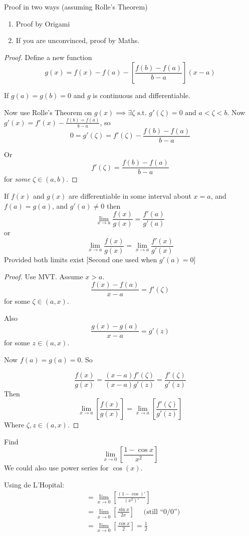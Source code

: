 \documentclass[twoside]{scrartcl}
\begin{document}
Proof in two ways (assuming Rolle's Theorem)

\begin{enumerate}
  \item Proof by Origami
  \item If you are unconvinced, proof by Maths. 
\end{enumerate}

\begin{proof}
Define a new function 
\[g(x) = f(x) - f(a) - \left[\frac{f(b) -f(a)}{b-a}\right](x-a)\]

If $g(a) = g(b) = 0$ and $g$ is continuous and differentiable. 

Now use Rolle's Theorem on $g(x) \implies \exists \zeta \text{ s.t. } g'(\zeta) = 0 \text{ and } a < \zeta < b$. Now $g'(x) = f'(x) - \frac{f(b) = f(a)}{b-a}$, so 
\[0 = g'(\zeta) = f'(\zeta) - \frac{f(b) - f(a)}{b-a}\]

Or
\[f'(\zeta) = \frac{f(b) - f(a)}{b-a}\]
for \emph{some} $\zeta \in (a,b)$.
\end{proof}


\vspace*{5pt}

\begin{theorem}
If $f(x)$ and $g(x)$ are differentiable in some interval about $x=a$, and $f(a) = g(a)$, and $g'(a) \neq 0$ then 
\[\lim_{x \to a}\frac{f(x)}{g(x)} = \frac{f'(a)}{g'(a)}\]	
or
\[\lim_{x \to a}\frac{f(x)}{g(x)} = \lim_{x \to a}\frac{f'(x)}{g'(x)}\]	
Provided both limits exist [Second one used when $g'(a) = 0$]
\end{theorem}\vspace*{5pt}


\begin{proof}
Use MVT. Assume $x > a$. 
\[\frac{f(x) - f(a)}{x-a} = f'(\zeta)\]
for some $\zeta \in (a,x)$. 

Also 
\[\frac{g(x) - g(a)}{x-a} = g'(z)\]
for some $z \in (a,x)$. 

Now $f(a) = g(a) = 0$. So 

\[\frac{f(x)}{g(x)} = \frac{(x-a)f'(\zeta)}{(x-a)g'(z)} = \frac{f'(\zeta)}{g'(z)}\]
Then 
\[\lim_{x \to a} \left[\frac{f(x)}{g(x)}\right] = \lim_{x \to a}\left[\frac{f'(\zeta)}{g'(z)}\right]\]
Where $\zeta, z \in (a,x)$. 
\end{proof}\vspace*{5pt}


\begin{example}
Find 
\[\lim_{x \to 0}\left[\frac{1-\cos x}{x^2}\right]\]
We could also use power series for $\cos(x)$. 

Using de L'Hopital: 
\[
\begin{aligned}
  &= \lim_{x \to 0}\left[\frac{(1-\cos)'}{(x^2)'}\right]\\
  &= \lim_{x \to 0}\left[\frac{\sin x}{2x}\right]\quad \mbox{ (still ``$0/0$'')}\\
  &= \lim_{x \to 0}\left[\frac{\cos x}{2}\right] = \frac{1}{2}
\end{aligned}
\]
\end{example}\vspace*{5pt}
\end{document}
